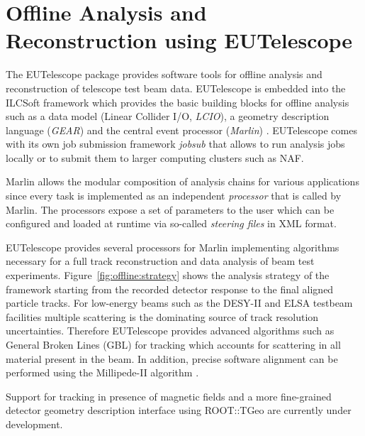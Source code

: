 \section{Offline Analysis and Reconstruction using EUTelescope}
\label{sec:offline}

The EUTelescope package \cite{Corrin2009} provides software tools for offline analysis and reconstruction of telescope test beam data. EUTelescope is embedded into the ILCSoft framework which provides the basic building blocks for offline analysis such as a data model (Linear Collider I/O, \emph{LCIO}), a geometry description language (\emph{GEAR}) and the central event processor (\emph{Marlin}) \cite{EUDET-2008-48}. EUTelescope comes with its own job submission framework \emph{jobsub} that allows to run analysis jobs locally or to submit them to larger computing clusters such as NAF.

Marlin allows the modular composition of analysis chains for various applications since every task is implemented as an independent \emph{processor} that is called by Marlin. The processors expose a set of parameters to the user which can be configured and loaded at runtime via so-called \emph{steering files} in XML format.

EUTelescope provides several processors for Marlin implementing algorithms necessary for a full track reconstruction and data analysis of beam test experiments. Figure~\ref{fig:offline:strategy} shows the analysis strategy of the framework starting from the recorded detector response to the final aligned particle tracks. 
For low-energy beams such as the DESY-II and ELSA testbeam facilities multiple scattering is the dominating source of track resolution uncertainties. Therefore EUTelescope provides advanced algorithms such as General Broken Lines (GBL) \cite{Kleinwort-2012} for tracking which accounts for scattering in all material present in the beam. In addition, precise software alignment can be performed using the Millipede-II algorithm \cite{Blobel-2006}.

Support for tracking in presence of magnetic fields and a more fine-grained detector geometry description interface using ROOT::TGeo are currently under development.

